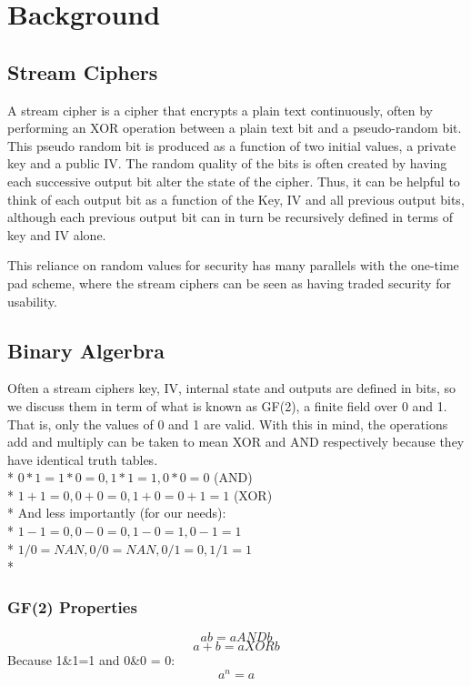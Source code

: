\documentclass{report}
\begin{document}
\chapter{Background}
\section{Stream Ciphers}
A stream cipher is a cipher that encrypts a plain text continuously, often by performing an XOR operation between a plain text bit and a pseudo-random bit. This pseudo random bit is produced as a function of two initial values, a private key and a public IV. The random quality of the bits is often created by having each successive output bit alter the state of the cipher. Thus, it can be helpful to think of each output bit as a function of the Key, IV and all previous output bits, although each previous output bit can in turn be recursively defined in terms of key and IV alone.

This reliance on random values for security has many parallels with the one-time pad scheme, where the stream ciphers can be seen as having traded security for usability.

\section{Binary Algerbra}
Often a stream ciphers key, IV, internal state and outputs are defined in bits, so we discuss them in term of what is known as GF(2), a finite field over 0 and 1. That is, only the values of 0 and 1 are valid. With this in mind, the operations add and multiply can be taken to mean XOR and AND respectively because they have identical truth tables.\\*
	$0*1 = 1*0=0, 1*1=1, 0*0=0$ (AND)\\*
	$1+1=0, 0+0=0, 1+0=0+1=1$ (XOR)\\*
	And less importantly (for our needs):\\*
	$1-1=0, 0-0=0, 1-0=1, 0-1=1$\\*
	$1/0=NAN, 0/0=NAN, 0/1=0, 1/1=1$\\*
	
\subsection{GF(2) Properties}
\begin{equation} \label{eq:timesand}
ab = a AND b
\end{equation}
\begin{equation} \label{eq:addxor}
a+b = a XOR b
\end{equation}
Because 1\&1=1 and 0\&0 = 0:
\begin{equation} \label{eq:GFpowers}
a^n = a
\end{equation}
\end{document}
